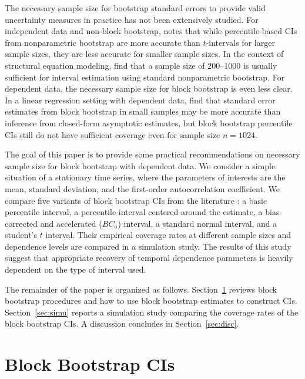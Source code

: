 \documentclass[12pt, letterpaper, titlepage]{article}
\begin{document}
The necessary sample size for bootstrap standard errors to provide valid
uncertainty measures in practice has not been extensively studied. For
independent data and non-block bootstrap, \citet{hesterberg2015teachers} notes
that while percentile-based CIs from nonparametric bootstrap
are more accurate than $t$-intervals for larger sample sizes, they are
less accurate for smaller sample sizes. In the context of structural equation
modeling, \citet{nevitt2001performance} find
that a sample size of 200--1000 is usually sufficient for interval estimation
using standard nonparametric bootstrap. For dependent data, the necessary
sample
size for block bootstrap is even less clear. In a linear regression setting
with
dependent data, \citet{goncalves2005bootstrap} find that standard error
estimates from block bootstrap in small samples may be more accurate than
inference from closed-form asymptotic estimates, but block bootstrap percentile
CIs still do not have sufficient coverage even for sample size
$n = 1024$.


The goal of this paper is to provide some practical recommendations on
necessary sample size for block bootstrap with dependent data. We consider a
simple situation of a stationary time series, where the parameters of
interests are the mean, standard deviation, and the first-order
autocorrelation coefficient. We compare five variants of block bootstrap
CIs from the literature \citep{diciccio1996bootstrap,
  rice2006mathematical}: a basic percentile interval, a percentile
interval centered around the estimate, a bias-corrected and
accelerated ($BC_a$) interval, a standard normal interval, and a student's $t$
interval. Their
empirical coverage rates at different sample sizes and dependence levels are
compared in a simulation study. The results of this study suggest that
appropriate recovery of temporal dependence parameters is heavily dependent on
the type of interval used.


The remainder of the paper is organized as follows.
Section~\ref{sec:bbci} reviews block bootstrap procedures and how to use block
bootstrap estimates to construct CIs. Section~\ref{sec:simu} reports a
simulation
study comparing the coverage rates of the block bootstrap CIs. A discussion
concludes in Section~\ref{sec:disc}.


\section{Block Bootstrap CIs}
\label{sec:bbci}
\end{document}
